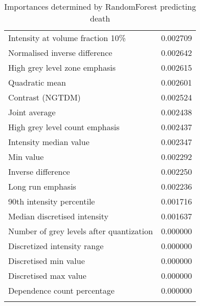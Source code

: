 \begin{longtable}{|lr|}
Intensity at volume fraction 10\%                   &        0.002709 \\
Normalised inverse difference                      &        0.002642 \\
High grey level zone emphasis                      &        0.002615 \\
Quadratic mean                                     &        0.002601 \\
Contrast (NGTDM)                                   &        0.002524 \\
Joint average                                      &        0.002438 \\
High grey level count emphasis                     &        0.002437 \\
Intensity median value                             &        0.002347 \\
Min value                                          &        0.002292 \\
Inverse difference                                 &        0.002250 \\
Long run emphasis                                  &        0.002236 \\
90th intensity percentile                          &        0.001716 \\
Median discretised intensity                       &        0.001637 \\
Number of grey levels after quantization           &        0.000000 \\
Discretized intensity range                        &        0.000000 \\
Discretised min value                              &        0.000000 \\
Discretised max value                              &        0.000000 \\
Dependence count percentage                        &        0.000000 \\
\bottomrule
\caption{Importances determined by RandomForest predicting death} %
\label{tab:RFimpoRad}
\end{longtable}

